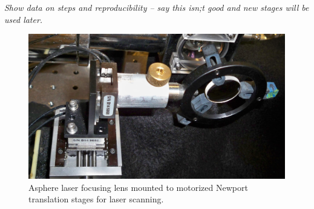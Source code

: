 \emph{\color{gray}Show data on steps and reproducibility -- say this isn;t good and new stages will be used later.}

\begin{figure} %
        \centering
                \includegraphics[width=.5\textwidth]{figures/stages_2.JPG}
                \caption{Asphere laser focusing lens mounted to motorized Newport translation stages for laser scanning.}
\label{fig:laserStages}
\end{figure}
